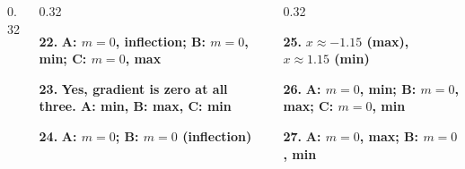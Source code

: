 \documentclass[aspectratio=169,12pt]{beamer}
\newcommand{\MMAnswer}[2]{\begin{MMAnswerCard}\raggedright\small\textbf{#1.} \textcolor{mmanswerColor}{\textbf{#2}}\par\end{MMAnswerCard}}
\begin{document}
\begin{frame}[t]
\begin{columns}[T,onlytextwidth]
\begin{column}{0.32\textwidth}
\end{column}
\begin{column}{0.32\textwidth}
\MMAnswer{22}{A: $m=0$, inflection; B: $m=0$, min; C: $m=0$, max}\MMAnswer{23}{Yes, gradient is zero at all three. A: min, B: max, C: min}\MMAnswer{24}{A: $m=0$; B: $m=0$ (inflection)}
\end{column}
\begin{column}{0.32\textwidth}
\MMAnswer{25}{$x\approx -1.15$ (max), $x\approx 1.15$ (min)}\MMAnswer{26}{A: $m=0$, min; B: $m=0$, max; C: $m=0$, min}\MMAnswer{27}{A: $m=0$, max; B: $m=0$, min}
\end{column}
\end{columns}
\end{frame}
\end{document}
